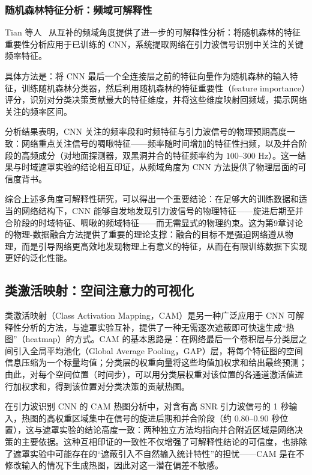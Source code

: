 \subsubsection*{随机森林特征分析：频域可解释性}

Tian 等人~\cite{tian2025cnn} 从互补的频域角度提供了进一步的可解释性分析：将随机森林的特征重要性分析应用于已训练的 CNN，系统提取网络在引力波信号识别中关注的关键频率特征。

具体方法是：将 CNN 最后一个全连接层之前的特征向量作为随机森林的输入特征，训练随机森林分类器，然后利用随机森林的特征重要性（feature importance）评分，识别对分类决策贡献最大的特征维度，并将这些维度映射回频域，揭示网络关注的频率区间。

分析结果表明，CNN 关注的频率段和时频特征与引力波信号的物理预期高度一致：网络重点关注信号的啁啾特征——频率随时间增加的特征性扫频，以及并合阶段的高频成分（对地面探测器，双黑洞并合的特征频率约为 $100$--$300$ Hz）。这一结果与时域遮罩实验的结论相互印证，从频域角度为 CNN 方法提供了物理层面的可信度背书。

综合上述多角度可解释性研究，可以得出一个重要结论：在足够大的训练数据和适当的网络结构下，CNN 能够自发地发现引力波信号的物理特征——旋进后期至并合阶段的时域特征、啁啾的频域特征——而无需显式的物理约束。这为第9章讨论的物理-数据融合方法提供了重要的理论支撑：融合的目标不是强迫网络遵从物理，而是引导网络更高效地发现物理上有意义的特征，从而在有限训练数据下实现更好的泛化性能。

\subsection{类激活映射：空间注意力的可视化}

类激活映射（Class Activation Mapping，CAM）是另一种广泛应用于 CNN 可解释性分析的方法，与遮罩实验互补，提供了一种无需逐次遮蔽即可快速生成“热图”（heatmap）的方式。CAM 的基本思路是：在网络最后一个卷积层与分类层之间引入全局平均池化（Global Average Pooling，GAP）层，将每个特征图的空间信息压缩为一个标量均值；分类层的权重向量将这些均值加权求和给出最终预测；由此，对每个空间位置（时间步），可以用分类层权重对该位置的各通道激活值进行加权求和，得到该位置对分类决策的贡献热图。

在引力波识别 CNN 的 CAM 热图分析中，对含有高 SNR 引力波信号的 1 秒输入，热图的高权重区域集中在信号的旋进后期和并合阶段（约 $0.80$--$0.90$ 秒位置），这与遮罩实验的结论高度一致：两种独立方法均指向并合附近区域是网络决策的主要依据。这种互相印证的一致性不仅增强了可解释性结论的可信度，也排除了遮罩实验中可能存在的“遮蔽引入不自然输入统计特性”的担忧——CAM 是在不修改输入的情况下生成热图，因此对这一潜在偏差不敏感。

